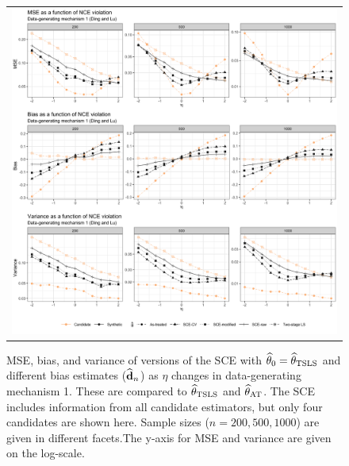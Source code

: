 \documentclass{article}
\def\sat{_{\text{AT}}}
\def\stsls{_{\text{TSLS}}}
\begin{document}
\begin{figure}
\centering
\begin{tabular}{c}
\includegraphics[width =\textwidth]{figures/secondary-sim-synth-compare-plot.png}
\end{tabular}\vspace{0.2in}
\caption{MSE, bias, and variance of versions of the SCE with $\thetahat_0 = \thetahat\stsls$ and different bias estimates (${\widehat {{\bf d}}}_n$) as $\eta$ changes in data-generating mechanism 1. These are compared to $\thetahat\stsls$ and $\thetahat\sat$. The SCE includes information from all candidate estimators, but only four candidates are shown here. Sample sizes ($n = 200, 500, 1000$) are given in different facets.The y-axis for MSE and variance are given on the log-scale.}\label{sec-sim-pl2}
\end{figure}


\end{document}
